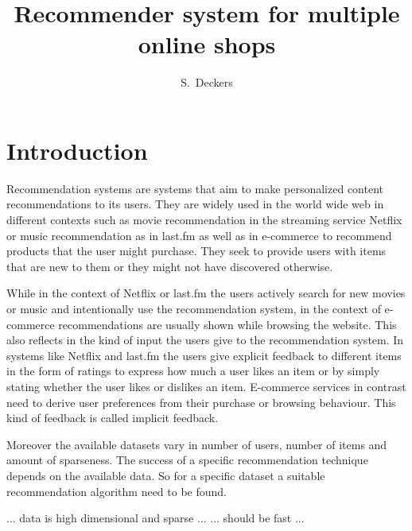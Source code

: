 \documentclass[10pt]{reportMaster}
\title{Recommender system for multiple online shops}
\author{S.\ Deckers}
\date{} %
\begin{document}
\maketitle

\chapter{Introduction}
Recommendation systems are systems that aim to make personalized content recommendations to its users.
They are widely used in the world wide web in different contexts such as movie recommendation in the streaming service Netflix or music recommendation as in last.fm as well as in e-commerce to recommend products that the user might purchase.
They seek to provide users with items that are new to them or they might not have discovered otherwise.

While in the context of Netflix or last.fm the users actively search for new movies or music and intentionally use the recommendation system, in the context of e-commerce recommendations are usually shown while browsing the website.
This also reflects in the kind of input the users give to the recommendation system.
In systems like Netflix and last.fm the users give explicit feedback to different items in the form of ratings to express how much a user likes an item or by simply stating whether the user likes or dislikes an item.
E-commerce services in contrast need to derive user preferences from their purchase or browsing behaviour.
This kind of feedback is called implicit feedback.


Moreover the available datasets vary in number of users, number of items and amount of sparseness.
The success of a specific recommendation technique depends on the available data.
So for a specific dataset a suitable recommendation algorithm need to be found.


... data is high dimensional and sparse ...
... should be fast ...

 
\end{document}
